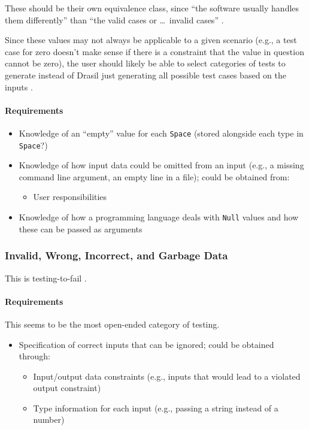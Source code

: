 These should be their own equivalence class, since ``the software usually
handles them differently'' than ``the valid cases or \dots\ invalid cases''
\citep[p.~78]{Patton2006}.

Since these values may not always be applicable to a given scenario (e.g., a
test case for zero doesn't make sense if there is a constraint that the value
in question cannot be zero), the user should likely be able to select
categories of tests to generate instead of Drasil just generating all possible
test cases based on the inputs \citep{june_11_meeting}.

\paragraph{Requirements}
\begin{itemize}
      \item Knowledge of an ``empty'' value for each \texttt{Space} (stored
            alongside each type in \texttt{Space}?)
      \item Knowledge of how input data could be omitted from an input
            (e.g., a missing command line argument, an empty line in a file);
            could be obtained from:
            \begin{itemize}
                  \item User responsibilities
            \end{itemize}
      \item Knowledge of how a programming language deals with \texttt{Null}
            values and how these can be passed as arguments
\end{itemize}

\subsubsection[Invalid, Wrong, Incorrect, and Garbage Data]{Invalid, Wrong,
      Incorrect, and Garbage Data \citep[pp.~78-79]{Patton2006}}

This is testing-to-fail \citep[p.~77]{Patton2006}.

\paragraph{Requirements}
This seems to be the most open-ended category of testing.
\begin{itemize}
      \item Specification of correct inputs that can be ignored;
            could be obtained through:
            \begin{itemize}
                  \item Input/output data constraints (e.g., inputs that would
                        lead to a violated output constraint)
                  \item Type information for each input (e.g., passing a string
                        instead of a number)
            \end{itemize}
\end{itemize}

